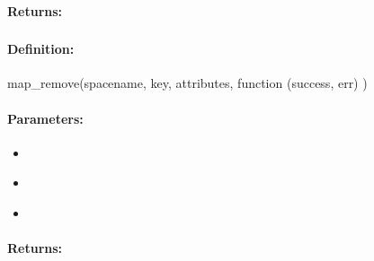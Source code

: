 \paragraph{Returns:}


\pagebreak
\subsubsection{}
\label{api:nodejs:map_remove}


\paragraph{Definition:}
\begin{javascriptcode}
map_remove(spacename, key, attributes, function (success, err) {})
\end{javascriptcode}
\paragraph{Parameters:}
\begin{itemize}[noitemsep]
\item {}\\

\item {}\\

\item {}\\

\end{itemize}

\paragraph{Returns:}


\pagebreak
\subsubsection{}
\label{api:nodejs:cond_map_remove}



